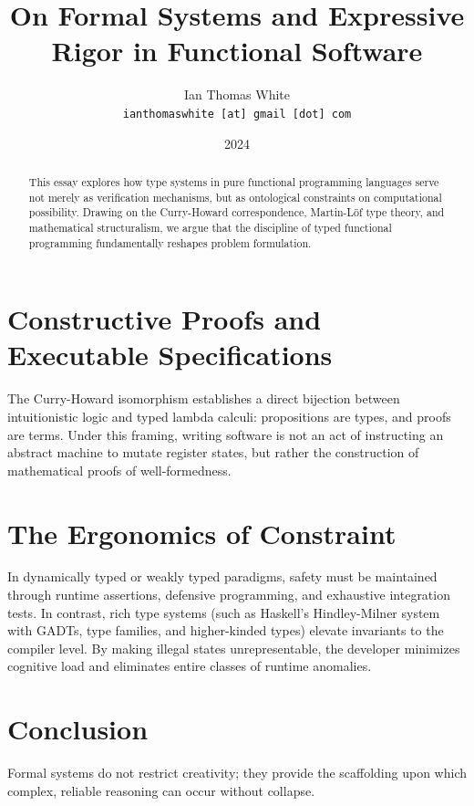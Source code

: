 \documentclass[11pt,article]{article}
\title{\textbf{On Formal Systems and Expressive Rigor in Functional Software}}
\author{Ian Thomas White \\ \texttt{ianthomaswhite\,[at]\,gmail\,[dot]\,com}}
\date{2024}
\begin{document}
\maketitle

\begin{abstract}
This essay explores how type systems in pure functional programming languages serve not merely as verification mechanisms, but as ontological constraints on computational possibility. Drawing on the Curry-Howard correspondence, Martin-Löf type theory, and mathematical structuralism, we argue that the discipline of typed functional programming fundamentally reshapes problem formulation.
\end{abstract}

\section{Constructive Proofs and Executable Specifications}

The Curry-Howard isomorphism establishes a direct bijection between intuitionistic logic and typed lambda calculi: propositions are types, and proofs are terms. Under this framing, writing software is not an act of instructing an abstract machine to mutate register states, but rather the construction of mathematical proofs of well-formedness.

\section{The Ergonomics of Constraint}

In dynamically typed or weakly typed paradigms, safety must be maintained through runtime assertions, defensive programming, and exhaustive integration tests. In contrast, rich type systems (such as Haskell's Hindley-Milner system with GADTs, type families, and higher-kinded types) elevate invariants to the compiler level. By making illegal states unrepresentable, the developer minimizes cognitive load and eliminates entire classes of runtime anomalies.

\section{Conclusion}

Formal systems do not restrict creativity; they provide the scaffolding upon which complex, reliable reasoning can occur without collapse.
\end{document}
